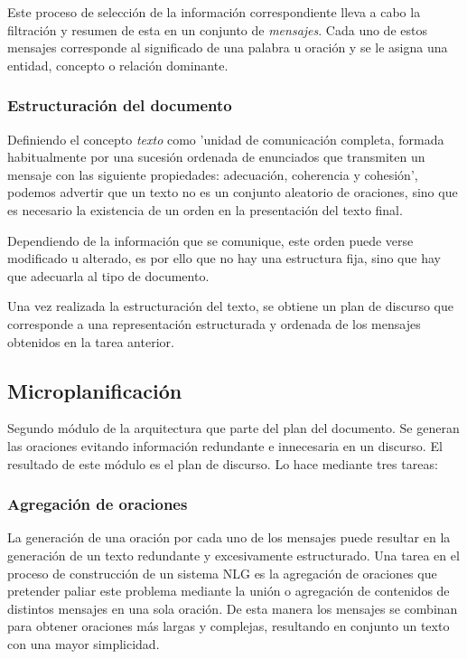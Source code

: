 Este proceso de selección de la información correspondiente lleva a cabo la filtración y resumen de esta en un conjunto de \textit{mensajes}. Cada uno de estos mensajes corresponde al significado de una palabra u oración y se le asigna una entidad, concepto o relación dominante.

\subsubsection{Estructuración del documento}
Definiendo el concepto \textit{texto} como 'unidad de comunicación completa, formada habitualmente por una sucesión ordenada de enunciados que transmiten un mensaje con las siguiente propiedades: adecuación, coherencia y cohesión', podemos advertir que un texto no es un conjunto aleatorio de oraciones, sino que es necesario la existencia de un orden en la presentación del texto final.

Dependiendo de la información que se comunique, este orden puede verse modificado u alterado, es por ello que no hay una estructura fija, sino que hay que adecuarla al tipo de documento.

Una vez realizada la estructuración del texto, se obtiene un plan de discurso que corresponde a una representación estructurada y ordenada de los mensajes obtenidos en la tarea anterior.

\subsection{Microplanificación}
Segundo módulo de la arquitectura que parte del plan del documento. Se generan las oraciones evitando información redundante e innecesaria en un discurso. El resultado de este módulo es el plan de discurso. Lo hace mediante tres tareas:

\subsubsection{Agregación de oraciones}
La generación de una oración por cada uno de los mensajes puede resultar en la generación de un texto redundante y excesivamente estructurado. Una tarea en el proceso de construcción de un sistema NLG es la agregación de oraciones que pretender paliar este problema mediante la unión o agregación de contenidos de distintos mensajes en una sola oración. De esta manera los mensajes se combinan para obtener oraciones más largas y complejas, resultando en conjunto un texto con una mayor simplicidad.


